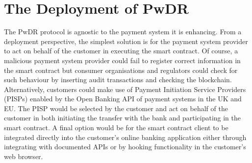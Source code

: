 
\vspace{-2.5mm}
\section{The Deployment of PwDR}\label{sec::PwDR-deployment}
The PwDR protocol is agnostic to the payment system it is enhancing. From a deployment perspective, the simplest solution is for the payment system provider to act on behalf of the customer in executing the smart contract. Of course, a malicious payment system provider could fail to register correct information in the smart contract but consumer organisations and regulators could check for such behaviour by inserting audit transactions and checking the blockchain. Alternatively, customers could make use of Payment Initiation Service Providers (PISPs) enabled by the Open Banking API of payment systems in the UK and EU. The PISP would be selected by the customer and act on behalf of the customer in both initiating the transfer with the bank and participating in the smart contract. A final option would be for the smart contract client to be integrated directly into the customer’s online banking application either through integrating with documented APIs or by hooking functionality in the customer’s web browser.